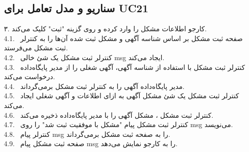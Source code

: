 \documentclass[12pt]{article}
\begin{document}
	\subsection{سناریو و مدل تعامل برای UC21}
	۳. کارجو اطلاعات مشکل را وارد کرده و روی گزینه "ثبت" کلیک می‌کند.\\
		4.1. \ صفحه ثبت مشکل بر اساس شناسه آگهی و مشکل ثبت شده آن‌ها را به کنترلر ثبت مشکل می‌فرستد.\\	4.2. \ کنترلر ثبت مشکل یک شئ خالی msg ایجاد می‌کند.\\
		4.3. \ کنترلر ثبت مشکل با استفاده از شناسه آگهی، آگهی شغلی را از مدیر پایگاه‌داده درخواست می‌کند.\\	4.4. \ مدیر پایگاه‌داده آگهی را به کنترلر ثبت مشکل برمی‌گرداند.\\
		4.5. \ کنترلر ثبت مشکل یک شئ مشکل آگهی به ازای اطلاعات و آگهی شغلی ایجاد می‌کند.\\	4.6. \ کنترلر ثبت مشکل ، مشکل آگهی را با مدیر پایگاه‌داده ذخیره می‌کند.\\
		4.7. \ کنترلر ثبت مشکل پیام "مشکل با موفقیت ثبت شد" را روی msg می‌نویسد.\\	4.8. \ کنترلر پیام msg را به صفحه ثبت مشکل برمی‌گرداند.\\
		4.9. \ صفحه ثبت مشکل پیام msg را به کارجو نمایش می‌دهد.
\end{document}
